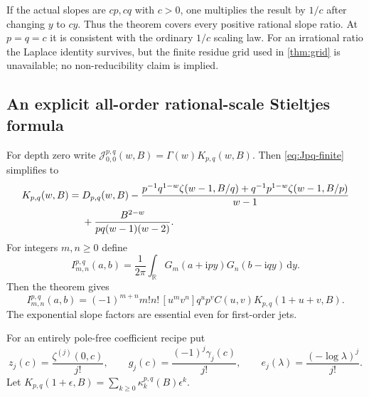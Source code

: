 \documentclass[11pt,a4paper]{article}
\theoremstyle{definition}
\numberwithin{equation}{section}
\newcommand{\R}{\mathbb R}
\newcommand{\dd}{\,\mathrm d}
\newcommand{\ii}{\mathrm i}
\begin{document}
If the actual slopes are $cp,cq$ with $c>0$, one multiplies the result
by $1/c$ after changing $y$ to $cy$. Thus the theorem covers every positive
rational slope ratio. At $p=q=c$ it is consistent with the ordinary
$1/c$ scaling law. For an irrational ratio the Laplace identity survives,
but the finite residue grid used in \cref{thm:grid} is unavailable; no
non-reducibility claim is implied.

\subsection{An explicit all-order rational-scale Stieltjes formula}
For depth zero write
$\mathcal J_{0,0}^{p,q}(w,B)=\Gamma(w)K_{p,q}(w,B)$.
Then \eqref{eq:Jpq-finite} simplifies to
\begin{align}
 K_{p,q}(w,B)={}&D_{p,q}(w,B)
 -\frac{p^{-1}q^{1-w}\zeta(w-1,B/q)
       +q^{-1}p^{1-w}\zeta(w-1,B/p)}{w-1}\notag\\
 &+\frac{B^{2-w}}{pq(w-1)(w-2)}.
                                  \label{eq:Kpq}
\end{align}
For integers $m,n\ge0$ define
\[
 I_{m,n}^{p,q}(a,b)=\frac1{2\pi}\int_{\R}
               G_m(a+\ii py)G_n(b-\ii qy)\dd y.
\]
Then the theorem gives
\begin{equation}\label{eq:rational-Stieltjes-jets}
 \boxed{\displaystyle
 I_{m,n}^{p,q}(a,b)=(-1)^{m+n}m!n!\,[u^mv^n]
       q^up^v C(u,v)K_{p,q}(1+u+v,B).}
\end{equation}
The exponential slope factors are essential even for first-order jets.

For an entirely pole-free coefficient recipe put
\begin{equation}\label{eq:coefficient-symbols}
 z_j(c)=\frac{\zeta^{(j)}(0,c)}{j!},\qquad
 g_j(c)=\frac{(-1)^j\gamma_j(c)}{j!},\qquad
 e_j(\lambda)=\frac{(-\log\lambda)^j}{j!}.
\end{equation}
Let
$K_{p,q}(1+\epsilon,B)=\sum_{k\ge0}\kappa_k^{p,q}(B)\epsilon^k$.
\end{document}
